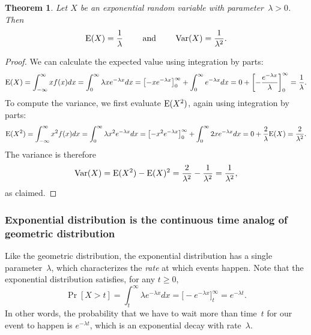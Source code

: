 \documentclass[11pt]{article}
\def\Ex#1{{\rm E}(#1)}
\def\Var#1{{\rm Var}(#1)}
\newcounter{thm}
\newtheorem{theorem}{Theorem}[thm]
\begin{document}
\begin{theorem}
Let $X$ be an exponential random variable with parameter~$\lambda > 0$. Then
$$\Ex{X} = \frac{1}{\lambda} \qquad \text{ and } \qquad \Var{X} = \frac{1}{\lambda^2}.$$
\end{theorem}
\begin{proof}
We can calculate the expected value using integration by parts:
$$
   \Ex{X} = \int_{-\infty}^\infty xf(x) dx = \int_0^\infty \lambda xe^{-\lambda x}dx
             = \bigl[-xe^{-\lambda x}\bigr]_0^\infty + \int_0^\infty e^{-\lambda x} dx
             = 0 + \left[-\frac{e^{-\lambda x}}{\lambda}\right]_0^\infty = \frac{1}{\lambda}.  $$
To compute the variance, we first evaluate $\Ex{X^2}$, again using integration by parts:
$$ \Ex{X^2} = \int_{-\infty}^\infty x^2f(x) dx = \int_0^\infty \lambda x^2e^{-\lambda x}dx
             = \bigl[-x^2e^{-\lambda x}\bigr]_0^\infty + \int_0^\infty 2xe^{-\lambda x} dx
             = 0 + \frac{2}{\lambda}\Ex{X} = \frac{2}{\lambda^2}.  $$
The variance is therefore $$
   \Var{X} = \Ex{X^2} - \Ex{X}^2 = \frac{2}{\lambda^2} - \frac{1}{\lambda^2} = \frac{1}{\lambda^2},$$
as claimed.
\end{proof}


\subsubsection*{Exponential distribution is the continuous time analog of geometric distribution}

Like the geometric distribution, the exponential distribution has a single parameter~$\lambda$,
which characterizes the {\it rate\/} at which events happen.
Note that the exponential distribution satisfies, for any $t\ge 0$,
\begin{equation}\label{eq:exptail}
   \Pr[X> t] = \int_t^\infty \lambda e^{-\lambda x} dx = \bigl[-e^{-\lambda x}\bigr]_t^\infty
                  = e^{-\lambda t}.
\end{equation}
In other words, the probability that we have to wait more than time~$t$ for our event
to happen is $e^{-\lambda t}$, which is an exponential decay with rate~$\lambda$.
\end{document}
